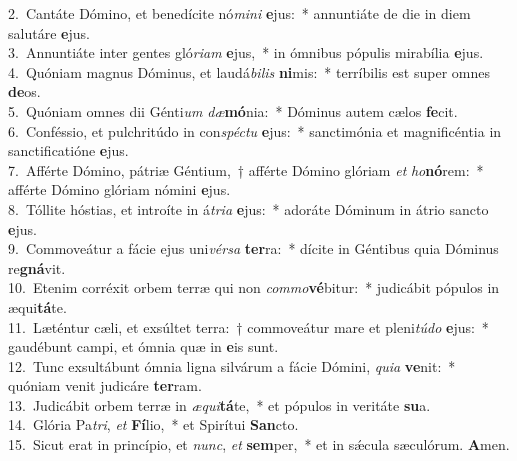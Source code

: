 {2.~}Cantáte Dómino, et benedícite nó\textit{mi}\textit{ni} \textbf{e}jus:~* annuntiáte de die in diem salutáre \textbf{e}jus.\\
{3.~}Annuntiáte inter gentes gló\textit{ri}\textit{am} \textbf{e}jus,~* in ómnibus pópulis mirabília \textbf{e}jus.\\
{4.~}Quóniam magnus Dóminus, et laudá\textit{bi}\textit{lis} \textbf{ni}mis:~* terríbilis est super omnes \textbf{de}os.\\
{5.~}Quóniam omnes dii Génti\textit{um} \textit{dæ}\textbf{mó}nia:~* Dóminus autem cælos \textbf{fe}cit.\\
{6.~}Conféssio, et pulchritúdo in con\textit{spé}\textit{ctu} \textbf{e}jus:~* sanctimónia et magnificéntia in sanctificatióne \textbf{e}jus.\\
{7.~}Afférte Dómino, pátriæ Géntium,~† afférte Dómino glóriam \textit{et} \textit{ho}\textbf{nó}rem:~* afférte Dómino glóriam nómini \textbf{e}jus.\\
{8.~}Tóllite hóstias, et introíte in á\textit{tri}\textit{a} \textbf{e}jus:~* adoráte Dóminum in átrio sancto \textbf{e}jus.\\
{9.~}Commoveátur a fácie ejus uni\textit{vér}\textit{sa} \textbf{ter}ra:~* dícite in Géntibus quia Dóminus re\textbf{gná}vit.\\
{10.~}Etenim corréxit orbem terræ qui non \textit{com}\textit{mo}\textbf{vé}bitur:~* judicábit pópulos in æqui\textbf{tá}te.\\
{11.~}Læténtur cæli, et exsúltet terra:~† commoveátur mare et pleni\textit{tú}\textit{do} \textbf{e}jus:~* gaudébunt campi, et ómnia quæ in \textbf{e}is sunt.\\
{12.~}Tunc exsultábunt ómnia ligna silvárum a fácie Dómini, \textit{qui}\textit{a} \textbf{ve}nit:~* quóniam venit judicáre \textbf{ter}ram.\\
{13.~}Judicábit orbem terræ in \textit{æ}\textit{qui}\textbf{tá}te,~* et pópulos in veritáte \textbf{su}a.\\
{14.~}Glória Pa\textit{tri}, \textit{et} \textbf{Fí}lio,~* et Spirítui \textbf{San}cto.\\
{15.~}Sicut erat in princípio, et \textit{nunc}, \textit{et} \textbf{sem}per,~* et in sǽcula sæculórum. \textbf{A}men.\\
